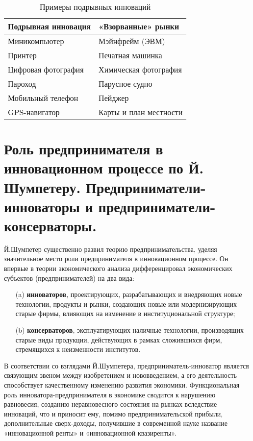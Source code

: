 \documentclass[11pt]{article}
\theoremstyle{plain} %
\theoremstyle{definition} %
\theoremstyle{remark} %
\begin{document}
\begin{longtable}{|p{200pt}|p{200pt}|}

	\caption{Примеры подрывных инноваций}
	\\
	\hline
	\textbf{Подрывная инновация} & \textbf{«Взорванные» рынки}
	\\
	\hline
	\endfirsthead
	Миникомпьютер & Мэйнфрейм (ЭВМ) \\
	\hline
	Принтер & Печатная машинка \\
	\hline
	Цифровая фотография & Химическая фотография \\
	\hline
	Пароход & Парусное судно \\
	\hline
	Мобильный телефон & Пейджер \\
	\hline
	GPS-навигатор & Карты и план местности \\
	\hline
\end{longtable}

\newpage

\section{Роль предпринимателя в инновационном процессе по Й. Шумпетеру. Предприниматели-инноваторы и предприниматели-консерваторы.}\label{erste}

Й.Шумпетер  существенно  развил  теорию  предпринимательства,  уделяя значительное  место  роли  предпринимателя  в  инновационном  процессе. Он впервые  в  теории  экономического  анализа  дифференцировал  экономических субъектов (предпринимателей) на два вида:

\begin{itemize}
	\item[(a)] \textbf{инноваторов}, проектирующих,  разрабатывающих  и  внедряющих новые технологии, продукты и рынки, создающих новые или модернизирующих старые фирмы, влияющих на изменение в институциональной структуре;
	\item[(b)] \textbf{консерваторов}, эксплуатирующих    наличные    технологии, производящих  старые виды  продукции,  действующих  в  рамках  сложившихся фирм, стремящихся к неизменности институтов.
\end{itemize}

В соответствии со взглядами Й.Шумпетера, предприниматель-инноватор является связующим  звеном между изобретением  и  нововведением, а  его деятельность способствует качественному изменению развития экономики. Функциональная  роль  инноватора-предпринимателя  в  экономике  сводится  к нарушению  равновесия,  созданию  неравновесного  состояния  на  рынках вследствие  инноваций,  что  и  приносит  ему,  помимо  предпринимательской прибыли,  дополнительные  сверх-доходы,  получившие  в  современной  науке название «инновационной ренты» и «инновационной квазиренты».
\end{document}

